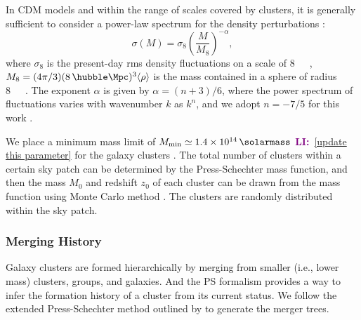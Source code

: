 \documentclass[modern]{aastex61}
\newcommand{\R}[1]{\mathrm{#1}}
\newcommand{\LI}[1]{\textcolor{purple}{\textbf{LI:}}~\uline{#1}}
\begin{document}
In CDM models and within the range of scales covered by clusters,
it is generally sufficient to consider a power-law spectrum
for the density perturbations \citep{sarazin2002,randall2002}:
\begin{equation}
  \label{eq:sigma-mass}
  \sigma(M) = \sigma_8 \left( \frac{M}{M_8} \right)^{-\alpha},
\end{equation}
where $\sigma_8$ is the present-day rms density fluctuations on a
scale of \SI{8}{\per\hubble\Mpc},
$M_8 = (4\pi/3)(8 \,\si{\per\hubble\Mpc})^3 \langle{\rho}\rangle$
is the mass contained in a sphere of radius \SI{8}{\per\hubble\Mpc}.
The exponent $\alpha$ is given by $\alpha = (n+3)/6$, where
the power spectrum of fluctuations varies with wavenumber $k$
as $k^n$, and we adopt $n = -7/5$ for this work \citep{randall2002}.

We place a minimum mass limit of $M_{\R{min}} \simeq \SI{1.4e14}{\solarmass}$
\LI{[update this parameter]} for the galaxy clusters \citep{zandanel2014}.
The total number of clusters within a certain sky patch can be
determined by the Press-Schechter mass function, and then the mass
$M_0$ and redshift $z_0$ of each cluster can be drawn from the mass
function using Monte Carlo method \citep{wang2010}.
The clusters are randomly distributed within the sky patch.


\subsubsection{Merging History}
\label{sec:merging-history}

Galaxy clusters are formed hierarchically by merging from smaller (i.e.,
lower mass) clusters, groups, and galaxies.
And the PS formalism provides a way to infer the formation history
of a cluster from its current status.
We follow the extended Press-Schechter method outlined by \citet{lacey1993}
to generate the merger trees.
\end{document}
